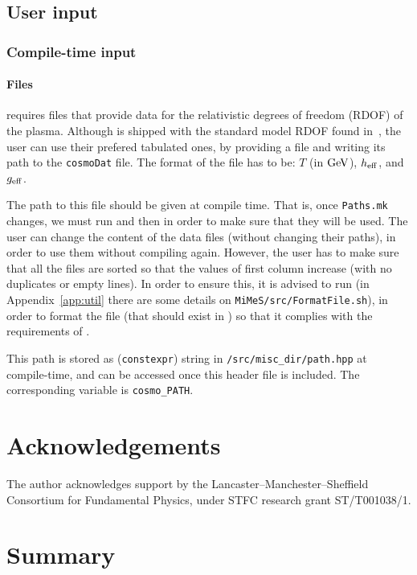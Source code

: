 \documentclass[11pt,a4paper]{article}
\begin{document}
\subsection{User input}\label{sec:input}
%
\subsubsection{Compile-time input}\label{sec:compile_time_input} 
%
\paragraph{Files} \nsc requires files that provide data for the relativistic degrees of freedom (RDOF) of the plasma. Although \nsc is shipped with the standard model RDOF found in~\cite{Saikawa:2020swg}, the user can use their prefered tabulated ones, by providing a file and writing its path to the {\tt cosmoDat} file. The format of the file has to be: $T$ (in ${\rm GeV}$), $h_{\rm eff}{}$, and $g_{\rm eff}{}$.

The path to this file should be given at compile time. That is, once {\tt Paths.mk} changes, we must run  and then  in order to make sure that they will be used. The user can change the content of the data files (without changing their paths), in order to use them without compiling \nsc again. However, the user has to make sure that all the files are sorted so that the values of first column increase (with no duplicates or empty lines). In order to ensure this, it is advised to run  (in Appendix~\ref{app:util} there are some details on {\tt MiMeS/src/FormatFile.sh}), in order to format the file (that should exist in ) so that it complies with the requirements of \nsc.

This path is stored as ({\tt constexpr}) string in {\tt \nsc/src/misc\_dir/path.hpp} at compile-time, and can be accessed once this header file is included. The corresponding variable is {\tt cosmo\_PATH}.








\section{Acknowledgements}
%
The author acknowledges support by the Lancaster–Manchester–Sheffield Consortium for Fundamental Physics, under STFC research grant ST/T001038/1.


\section{Summary}
\end{document}
